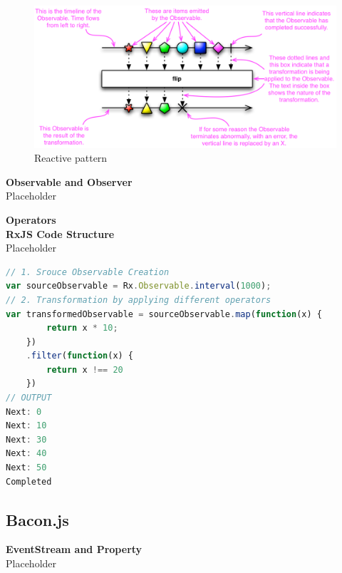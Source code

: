 





\begin{figure}[!h]
	\centering
	\includegraphics[scale=0.5,trim=0 0 0 0]{gfx/rxjs-reactive-pattern2.png}
	\caption{Reactive pattern \protect\cite{ReactiveXobservable}}
	\label{fig:rxjs-reactive-pattern}
\end{figure}

\textbf{Observable and Observer}\\
Placeholder

\textbf{Operators}
\label{subsec:Operators}\\

\textbf{RxJS Code Structure}\\
Placeholder
\begin{lstlisting}[language=JavaScript, caption=RxJS Simple Example, label={lst:RxJS_Simple_Example}]
// 1. Srouce Observable Creation
var sourceObservable = Rx.Observable.interval(1000);
// 2. Transformation by applying different operators
var transformedObservable = sourceObservable.map(function(x) {
		return x * 10;
	})
	.filter(function(x) {
		return x !== 20
	})
// OUTPUT
Next: 0
Next: 10
Next: 30
Next: 40
Next: 50
Completed
\end{lstlisting}

\subsection{Bacon.js}

\textbf{EventStream and Property}\\
Placeholder

